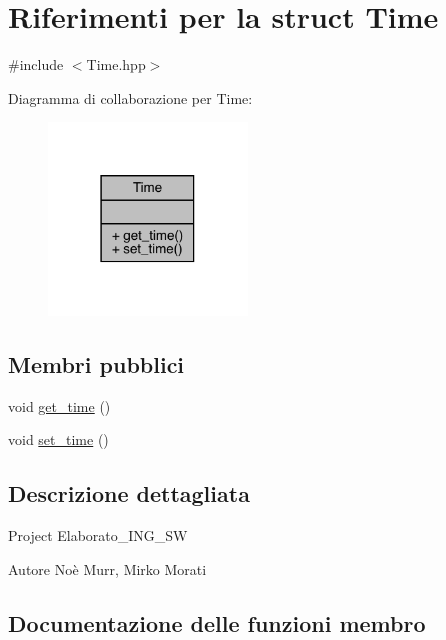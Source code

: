 \hypertarget{struct_time}{}\section{Riferimenti per la struct Time}
\label{struct_time}


{\ttfamily \#include $<$Time.\+hpp$>$}



Diagramma di collaborazione per Time\+:\nopagebreak
\begin{figure}[H]
\begin{center}
\leavevmode
\includegraphics[width=150pt]{df/d8c/struct_time__coll__graph}
\end{center}
\end{figure}
\subsection*{Membri pubblici}
\begin{DoxyCompactItemize}
\item 
void \hyperlink{struct_time_ab9a42b7809f059a61d89123fb6cd0cf5}{get\+\_\+time} ()
\item 
void \hyperlink{struct_time_a76fe3565c8497fe80720123aa0b988fb}{set\+\_\+time} ()
\end{DoxyCompactItemize}


\subsection{Descrizione dettagliata}
Project Elaborato\+\_\+\+I\+N\+G\+\_\+\+SW \begin{DoxyAuthor}{Autore}
Noè Murr, Mirko Morati 
\end{DoxyAuthor}


\subsection{Documentazione delle funzioni membro}
\mbox{\label{struct_time_ab9a42b7809f059a61d89123fb6cd0cf5}} 
